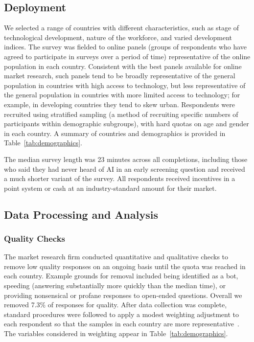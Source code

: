 \documentclass[sigconf]{acmart}
\begin{document}
\subsection{Deployment}
We selected a range of countries with different characteristics, such as stage of technological development, nature of the workforce, and varied development indices. The survey was fielded to online panels (groups of respondents who have agreed to participate in surveys over a period of time) representative of the online population in each country. Consistent with the best panels available for online market research, such panels tend to be broadly representative of the general population in countries with high access to technology, but less representative of the general population in countries with more limited access to technology; for example, in developing countries they tend to skew urban. Respondents were recruited using stratified sampling (a method of recruiting specific numbers of participants within demographic subgroups), with hard quotas on age and gender in each country. A summary of countries and demographics is provided in Table~\ref{tab:demographics}. 

The median survey length was 23 minutes across all completions, including those who said they had never heard of AI in an early screening question and received a much shorter variant of the survey. All respondents received incentives in a point system or cash at an industry-standard amount for their market.

\subsection{Data Processing and Analysis}

\subsubsection{Quality Checks}
The market research firm conducted quantitative and qualitative checks to remove low quality responses on an ongoing basis until the quota was reached in each country. Example grounds for removal included being identified as a bot, speeding (answering substantially more quickly than the median time), or providing nonsensical or profane responses to open-ended questions. Overall we removed 7.3\% of responses for quality. After data collection was complete, standard procedures were followed to apply a modest weighting adjustment to each respondent so that the samples in each country are more representative~\cite{biemer2008weighting}. The variables considered in weighting appear in Table~\ref{tab:demographics}.
\end{document}
